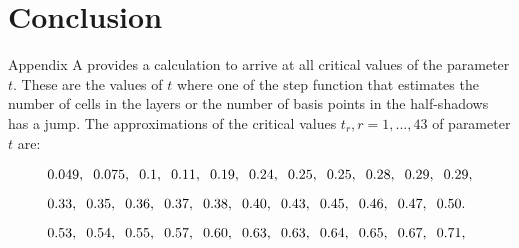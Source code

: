 \chapter{Conclusion}
Appendix A provides a calculation to arrive at all critical values of the parameter $t$. These are the values of $t$ where one of the step function that estimates the number of cells in the layers or the number of basis points in the half-shadows has a jump. The approximations of the critical values $t_{r}, r = 1, ..., 43$ of parameter $t$ are:

\begin{align*}
&0.049, \text{\hspace{0.2cm}} 0.075, \text{\hspace{0.2cm}}
0.1, \text{\hspace{0.2cm}} 0.11, \text{\hspace{0.2cm}} 0.19, \text{\hspace{0.2cm}} 0.24, \text{\hspace{0.2cm}} 0.25, \text{\hspace{0.2cm}} 0.25, \text{\hspace{0.2cm}} 0.28, \text{\hspace{0.2cm}} 0.29, \text{\hspace{0.2cm}} 0.29,  \\[6pt]%
&0.33, \text{\hspace{0.2cm}} 0.35, \text{\hspace{0.2cm}} 0.36, \text{\hspace{0.2cm}} 0.37, \text{\hspace{0.2cm}} 0.38, \text{\hspace{0.2cm}} 0.40, \text{\hspace{0.2cm}} 0.43, \text{\hspace{0.2cm}} 0.45, \text{\hspace{0.2cm}} 0.46, \text{\hspace{0.2cm}} 0.47, \text{\hspace{0.2cm}} 0.50.  \\[6pt]
&0.53, \text{\hspace{0.2cm}} 0.54, \text{\hspace{0.2cm}} 0.55, \text{\hspace{0.2cm}} 0.57, \text{\hspace{0.2cm}} 0.60, \text{\hspace{0.2cm}} 0.63, \text{\hspace{0.2cm}} 0.63, \text{\hspace{0.2cm}} 0.64, \text{\hspace{0.2cm}} 0.65, \text{\hspace{0.2cm}} 0.67, \text{\hspace{0.2cm}} 0.71,  \\[6pt]%

\end{align*}
